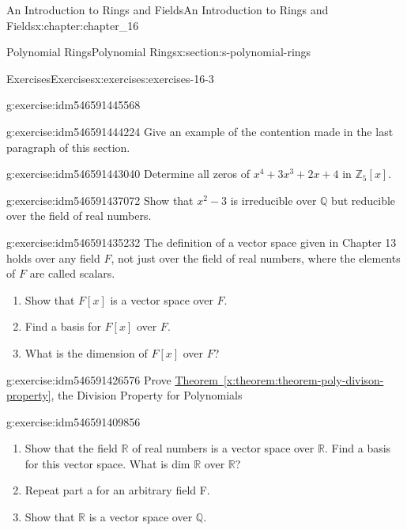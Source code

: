 \documentclass[oneside,10pt,]{book}
\newcommand{\xreffont}{\relax}
\numberwithin{equation}{section}
\begin{document}
\begin{chapterptx}{An Introduction to Rings and Fields}{}{An Introduction to Rings and Fields}{}{}{x:chapter:chapter_16}
\begin{sectionptx}{Polynomial Rings}{}{Polynomial Rings}{}{}{x:section:s-polynomial-rings}
\begin{exercises-subsection}{Exercises}{}{Exercises}{}{}{x:exercises:exercises-16-3}
\begin{divisionexercise}{6}{}{}{g:exercise:idm546591445568}
\end{divisionexercise}%
\begin{divisionexercise}{7}{}{}{g:exercise:idm546591444224}%
Give an example of the contention made in the last paragraph of this section.%
\end{divisionexercise}%
\begin{divisionexercise}{8}{}{}{g:exercise:idm546591443040}%
Determine all zeros of \(x^4+ 3x^3 + 2x + 4\) in \(\mathbb{Z}_5[x]\).%
\end{divisionexercise}%
\begin{divisionexercise}{9}{}{}{g:exercise:idm546591437072}%
Show that \(x^2 - 3\) is irreducible over \(\mathbb{Q}\) but reducible over the field of real numbers.%
\end{divisionexercise}%
\begin{divisionexercise}{10}{}{}{g:exercise:idm546591435232}%
The definition of a vector space given in Chapter 13 holds over any field \(F\), not just over the field of real numbers, where the elements of \(F\) are called scalars.%
\begin{enumerate}[label=(\alph*)]
\item{}Show that \(F[x]\) is a vector space over \(F\).%
\item{}Find a basis for \(F[x]\) over \(F\).%
\item{}What is the dimension of \(F[x]\) over \(F\)?%
\end{enumerate}
%
\end{divisionexercise}%
\begin{divisionexercise}{11}{}{}{g:exercise:idm546591426576}%
Prove \hyperref[x:theorem:theorem-poly-divison-property]{Theorem~{\xreffont\ref{x:theorem:theorem-poly-divison-property}}}, the Division Property for Polynomials%
\end{divisionexercise}%
\begin{divisionexercise}{12}{}{}{g:exercise:idm546591409856}%
%
\begin{enumerate}[label=(\alph*)]
\item{}Show that the field \(\mathbb{R}\) of real numbers is a vector space over \(\mathbb{R}\). Find a basis for this vector space. What is dim \(\mathbb{R}\) over \(\mathbb{R}\)?%
\item{}Repeat part a for an arbitrary field F.%
\item{}Show that \(\mathbb{R}\) is a vector space over \(\mathbb{Q}\).%
\end{enumerate}
%
\end{divisionexercise}%

\end{exercises-subsection}
\end{sectionptx}
\end{chapterptx}
\end{document}
